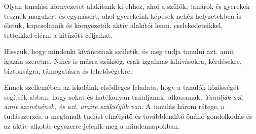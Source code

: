 Olyan tanulási környezetet alakítunk ki ehhez, ahol a szülők, tanárok és gyerekek tesznek magukért és egymásért, ahol gyerekeink képesek nehéz helyzetekben is életük, kapcsolataik és környezetük aktív alakítói lenni, cselekedeteikkel, tetteikkel elérni a kitűzött céljaikat.

Hisszük, hogy mindenki kíváncsinak születik, és meg tudja tanulni azt, amit igazán szeretne. Nincs is másra szükség, csak izgalmas kihívásokra, kérdésekre, biztonságra, támogatásra és lehetőségekre.

Ennek szellemében az iskoláink elsődleges feladata, hogy a tanulók közösségét segítsék abban, hogy sokat és hatékonyan tanuljanak, alkossanak. \emph{Tanulják azt, amit szeretnének, és azt, amire szükségük van.} A tanulás három rétege, a tudásszerzés, a megtanult tudást elmélyítő és továbblendítő önálló gondolkodás és az aktív alkotás egyszerre jelenik meg a mindennapokban.
